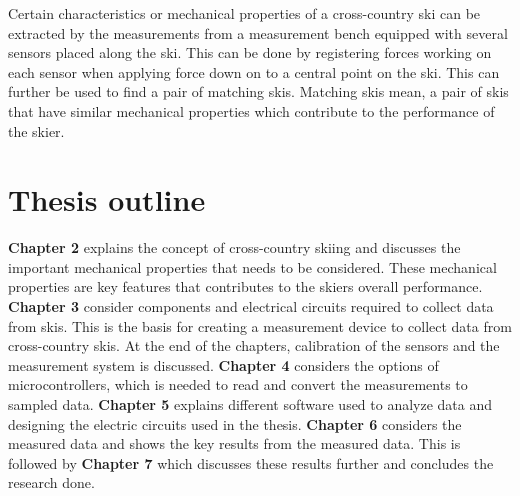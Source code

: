 Certain characteristics or mechanical properties of a cross-country ski can be extracted by the measurements from a measurement bench equipped with several sensors placed along the ski. This can be done by registering forces working on each sensor when applying force down on to a central point on the ski. This can further be used to find a pair of matching skis. Matching skis mean, a pair of skis that have similar mechanical properties which contribute to the performance of the skier.

\section{Thesis outline}
\textbf{Chapter 2} explains the concept of cross-country skiing and discusses the important mechanical properties that needs to be considered. These mechanical properties are key features that contributes to the skiers overall performance. \newline
\textbf{Chapter 3} consider components and electrical circuits required to collect data from skis. This is the basis for creating a measurement device to collect data from cross-country skis. At the end of the chapters, calibration of the sensors and the measurement system is discussed. \newline
\textbf{Chapter 4} considers the options of microcontrollers, which is needed to read and convert the measurements to sampled data. \newline
\textbf{Chapter 5} explains different software used to analyze data and designing the electric circuits used in the thesis. \newline
\textbf{Chapter 6} considers the measured data and shows the key results from the measured data. This is followed by \textbf{Chapter 7} which discusses these results further and concludes the research done.
